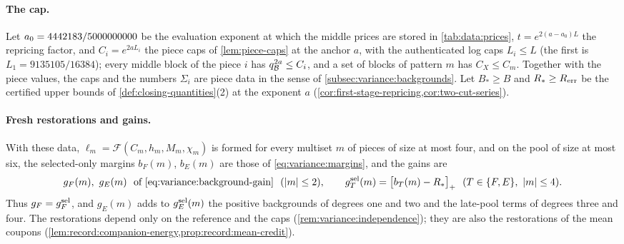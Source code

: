 \paragraph{The cap.}
Let $a_0=4442183/5000000000$ be the evaluation exponent at which the
middle prices are stored in \cref{tab:data:prices},
$t=e^{2(a-a_0)L}$ the repricing factor, and $C_i=e^{2aL_i}$ the piece caps of
\cref{lem:piece-caps} at the anchor $a$, with the authenticated log caps
$L_i\le L$ (the first is $L_1=9135105/16384$); every middle block of the piece $i$
has $q_\mathcal B^{2a}\le C_i$, and a set of blocks of pattern $m$ has $C_X\le C_m$.
Together with the piece values, the caps and the numbers $\Sigma_i$ are piece data
in the sense of \cref{subsec:variance:backgrounds}. Let $B_*\ge B$ and
$R_*\ge R_{\rm err}$ be the certified upper bounds of
\cref{def:closing-quantities}(2) at the exponent $a$
(\cref{cor:first-stage-repricing,cor:two-cut-series}).

\paragraph{Fresh restorations and gains.}
With these data, $\ell_m=\mathcal F(C_m,h_m,M_m,\chi_m)$ is formed for every
multiset $m$ of pieces of size at most four, and on the pool of size at most six,
the selected-only margins $b_F(m)$, $b_E(m)$ are those of
\eqref{eq:variance:margins}, and the gains are
\begin{equation}\label{eq:variance:fresh}
 g_F(m),\ g_E(m)\ \ \text{of \eqref{eq:variance:background-gain}}\ \ (|m|\le2),
 \qquad
 g^{\rm sel}_T(m)=\bigl[b_T(m)-R_*\bigr]_+\ \ (T\in\{F,E\},\ |m|\le4).
\end{equation}
Thus $g_F=g^{\rm sel}_F$, and $g_E(m)$ adds to $g^{\rm sel}_E(m)$ the positive
backgrounds of degrees one and two and the late-pool terms of degrees three and
four. The restorations depend only on the reference and the caps
(\cref{rem:variance:independence}); they are also the restorations of the mean
coupons (\cref{lem:record:companion-energy,prop:record:mean-credit}).

